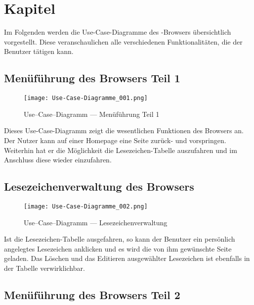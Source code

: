 
\chapter{Kapitel}

Im Folgenden werden die Use-Case-Diagramme des \SECH-Browsers übersichtlich vorgestellt. Diese veranschaulichen alle verschiedenen Funktionalitäten, die der Benutzer tätigen kann.

\section{Menüführung des Browsers Teil 1}

\begin{figure}[htb]
\texttt{[image: Use-Case-Diagramme\_001.png]}
	\caption{Use--Case--Diagramm --- Menüführung Teil 1}
	\label{fig:Menüführung Teil 1}
\end{figure}
	
Dieses Use-Case-Diagramm zeigt die wesentlichen Funktionen des Browsers an. Der Nutzer kann auf einer Homepage eine Seite zurück- und vorspringen. Weiterhin hat er die Möglichkeit die Lesezeichen-Tabelle auszufahren und im Anschluss diese wieder einzufahren.

\section{Lesezeichenverwaltung des Browsers}

\begin{figure}[htb]
\texttt{[image: Use-Case-Diagramme\_002.png]}
	\caption{Use--Case--Diagramm --- Lesezeichenverwaltung}
	\label{fig:Lesezeichenverwaltung}
\end{figure}

Ist die Lesezeichen-Tabelle ausgefahren, so kann der Benutzer ein persönlich angelegtes Lesezeichen anklicken und es wird die von ihm gewünschte Seite geladen. Das Löschen und das Editieren ausgewählter Lesezeichen ist ebenfalls in der Tabelle verwirklichbar.

\section{Menüführung des Browsers Teil 2}

